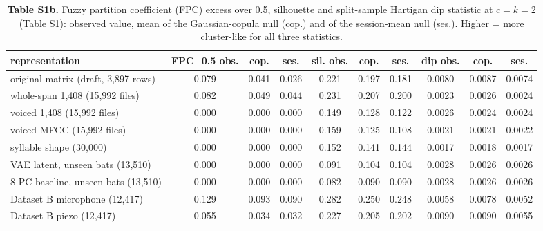 \begin{table}[htbp]\centering\scriptsize
\caption{\textbf{Table S1b.} Fuzzy partition coefficient (FPC) excess over 0.5, silhouette and split-sample Hartigan dip statistic at $c=k=2$ (Table S1): observed value, mean of the Gaussian-copula null (cop.) and of the session-mean null (ses.). Higher = more cluster-like for all three statistics.}\label{tab:S1b}
\begin{adjustbox}{max width=\linewidth}
\begin{tabular}{lccccccccc}
\toprule
representation & FPC$-$0.5 obs. & cop. & ses. & sil. obs. & cop. & ses. & dip obs. & cop. & ses. \\
\midrule
original matrix (draft, 3,897 rows) & 0.079 & 0.041 & 0.026 & 0.221 & 0.197 & 0.181 & 0.0080 & 0.0087 & 0.0074 \\
whole-span 1,408 (15,992 files) & 0.082 & 0.049 & 0.044 & 0.231 & 0.207 & 0.200 & 0.0023 & 0.0026 & 0.0024 \\
voiced 1,408 (15,992 files) & 0.000 & 0.000 & 0.000 & 0.149 & 0.128 & 0.122 & 0.0026 & 0.0024 & 0.0024 \\
voiced MFCC (15,992 files) & 0.000 & 0.000 & 0.000 & 0.159 & 0.125 & 0.108 & 0.0021 & 0.0021 & 0.0022 \\
syllable shape (30,000) & 0.000 & 0.000 & 0.000 & 0.152 & 0.141 & 0.144 & 0.0017 & 0.0018 & 0.0017 \\
VAE latent, unseen bats (13,510) & 0.000 & 0.000 & 0.000 & 0.091 & 0.104 & 0.104 & 0.0028 & 0.0026 & 0.0026 \\
8-PC baseline, unseen bats (13,510) & 0.000 & 0.000 & 0.000 & 0.082 & 0.090 & 0.090 & 0.0028 & 0.0026 & 0.0026 \\
Dataset B microphone (12,417) & 0.129 & 0.093 & 0.090 & 0.282 & 0.250 & 0.248 & 0.0058 & 0.0078 & 0.0052 \\
Dataset B piezo (12,417) & 0.055 & 0.034 & 0.032 & 0.227 & 0.205 & 0.202 & 0.0090 & 0.0090 & 0.0055 \\
\bottomrule
\end{tabular}
\end{adjustbox}
\end{table}
